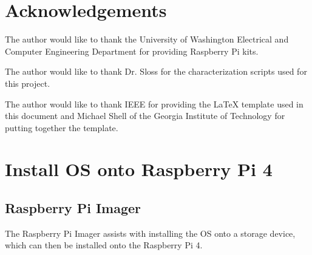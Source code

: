 \documentclass[journal]{IEEEtran}
\begin{document}
    \nocite{*}
    \newpage

    
    

    \newpage
    \section{Acknowledgements}
    The author would like to thank the University of Washington Electrical and Computer Engineering Department for providing Raspberry Pi kits.
    
    The author would like to thank Dr. Sloss for the characterization scripts used for this project.

    The author would like to thank IEEE for providing the LaTeX template used in this document and Michael Shell of the Georgia Institute of Technology for putting together the template.

    \appendices
    \section{Install OS onto Raspberry Pi 4}
    \subsection{Raspberry Pi Imager}

    The Raspberry Pi Imager assists with installing the OS onto a storage device, which can then be installed onto the Raspberry Pi 4.
\end{document}

